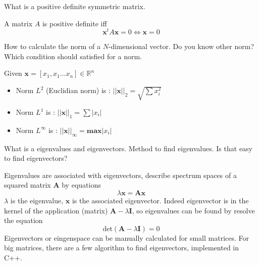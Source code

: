 \documentclass[answers]{exam}
\newcommand{\mathvec}[1]{\textbf{#1}}
\begin{document}
\begin{questions}
\question What is a positive definite symmetric matrix.
\begin{solution}[.2in]
A matrix $A$ is positive definite iff 
\[
\mathvec{x}^t A \mathvec{x} = 0 \Longleftrightarrow \mathvec{x}=0
\]
\end{solution}

\question How to calculate the norm of a $N$-dimensional vector. Do you know other norm? Which condition should satisfied for a norm.
\begin{solution}[.2in]
Given $\mathvec{x}=[x_1,x_1 ... x_n] \in \mathbb{R}^n$
\begin{itemize}
	\item Norm $L^2$ (Euclidian norm) is : $||\textbf{x}||_{2} = \sqrt{\sum x^2_i} $
	\item Norm $L^1$ is : $||\textbf{x}||_{1} = \sum |x_i|$
	\item Norm $L^\infty$ is : $||\textbf{x}||_{\infty} = \textbf{max} |x_i|$
\end{itemize}
\end{solution}

\question What is a eigenvalues and eigenvectors. Method to find eigenvalues. Is that easy to find eigenvectors?
\begin{solution}[.2in]
Eigenvalues are associated with eigenvectors, describe spectrum spaces of a squared matrix $\mathvec{A}$ by equations 
\[
\lambda\mathvec{x} = \mathvec{A}\mathvec{x}
\]
$\lambda$ is the eigenvalue, $\mathvec{x}$ is the associated eigenvector. Indeed eigenvector is in the kernel of the application (matrix) $\mathvec{A}-\lambda\mathvec{I}$, so eigenvalues can be found by resolve the equation
\[
\text{det}(\mathvec{A}-\lambda\mathvec{I})=0
\]
Eigenvectors or eingenspace can be manually calculated for small matrices. For big matrices, there are a few algorithm to find eigenvectors, implemented in C++.
\end{solution}


\end{questions}
\end{document}
